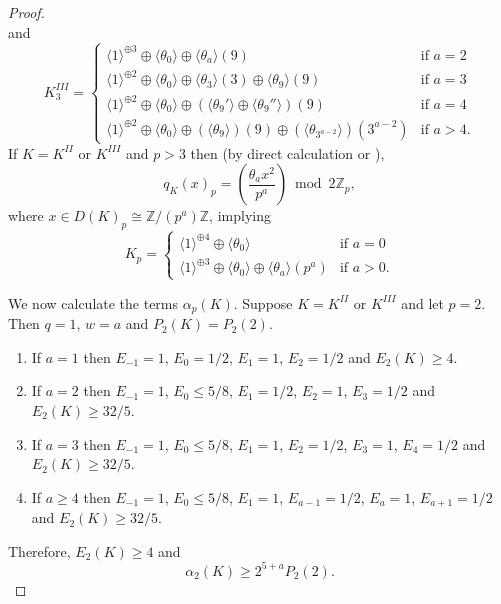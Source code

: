 \documentclass[12pt, a4paper]{article}
\newcommand{\ZZ}{\mathbb{Z}}
\newcommand{\la}{\langle}
\newcommand{\ra}{\rangle}
\newcommand{\op}{\oplus}
\begin{document}
\begin{proof}
\begin{equation*}
  \end{equation*}
  and 
  \begin{equation*}
    K_3^{III} =
    \begin{cases}
      \la 1 \ra^{\op 3} \op \la \theta_0 \ra \op \la \theta_a \ra (9) & \text{if $a=2$} \\
      \la 1 \ra^{\op 2} \op \la \theta_0 \ra \op \la \theta_3 \ra (3) \op \la \theta_9 \ra (9) & \text{if $a=3$} \\
      \la 1 \ra^{\op 2} \op \la \theta_0 \ra \op (\la \theta_9' \ra \op \la \theta_9'' \ra)(9) & \text{if $a=4$} \\
      \la 1 \ra^{\op 2} \op \la \theta_0 \ra \op (\la \theta_9 \ra)(9) \op (\la \theta_{3^{a-2}} \ra )(3^{a-2} ) & \text{if $a>4$}. 
    \end{cases}
  \end{equation*}
  If $K=K^{II}$ or $K^{III}$ and $p>3$ then (by direct calculation or \cite[Proposition 1.8.1]{Nikulin}),
  \begin{equation*}
    q_K(x)_p = \left (
    \frac{\theta_a x^2}{p^a} \right ) \bmod{ 2\ZZ_p}, 
  \end{equation*}
  where $x \in D(K)_p \cong \ZZ/(p^a) \ZZ$, implying 
  \begin{equation*}
    K_p =
    \begin{cases}
      \la 1 \ra^{\op 4} \op \la \theta_0 \ra & \text{if $a=0$} \\
      \la 1 \ra^{\op 3} \op \la \theta_0 \ra \op \la \theta_a \ra (p^a) & \text{if $a>0$.}
    \end{cases}
  \end{equation*}
  
  We now calculate the terms $\alpha_p(K)$. 
Suppose $K=K^{II}$ or $K^{III}$ and let $p=2$.
  Then $q=1$, $w=a$ and $P_2(K) = P_2(2)$.
  \begin{enumerate}
  \item  If $a=1$ then
    $E_{-1} = 1$,
    $E_0 = 1/2$,
    $E_1 = 1$,
    $E_2 = 1/2$
    and $E_2(K) \geq 4$. 
  \item If $a=2$ then
    $E_{-1} = 1$,
    $E_0 \leq 5/8$,
    $E_1 = 1/2$,
    $E_2 = 1$,
    $E_3 = 1/2$
    and 
    $E_2(K) \geq 32/5$.
  \item If $a=3$ then
    $E_{-1} = 1$,
    $E_0 \leq 5/8$,
    $E_1 = 1$,
    $E_2=1/2$,
    $E_3=1$,
    $E_4 = 1/2$
    and $E_2(K) \geq 32/5$.
  \item If $a \geq 4$ then
    $E_{-1} = 1$,
    $E_0 \leq 5/8$,
    $E_1=1$,
    $E_{a-1}=1/2$,
    $E_a=1$,
    $E_{a+1}=1/2$
    and 
    $E_2(K) \geq 32/5$.
  \end{enumerate}
  Therefore, $E_2(K) \geq 4$ and
  \[
  \alpha_2(K) \geq 2^{5+a} P_2(2).
  \]



\end{proof}
\end{document}
